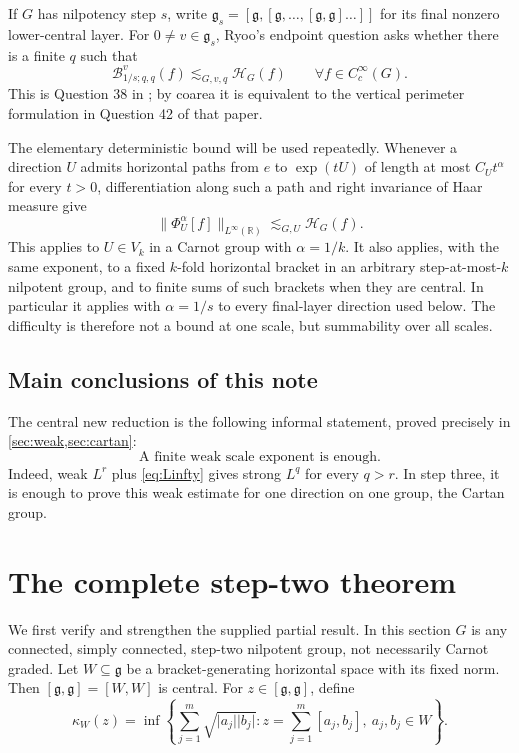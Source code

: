 \documentclass[11pt]{article}
\theoremstyle{definition}
\theoremstyle{remark}
\newcommand{\R}{\mathbb R}
\newcommand{\g}{\mathfrak g}
\newcommand{\abs}[1]{\lvert #1\rvert}
\newcommand{\norm}[1]{\lVert #1\rVert}
\newcommand{\HH}{\mathcal H}
\newcommand{\B}[4]{\mathcal B^{#1}_{#2;#3,#4}}
\newcommand{\prof}[3]{\Phi^{#1}_{#2}[#3]}
\newcommand{\less}{\lesssim}
\begin{document}
If \(G\) has nilpotency step \(s\), write \(\g_s=[\g,[\g,\ldots,[\g,\g]\ldots]]\)
for its final nonzero lower-central layer.  For \(0\ne v\in\g_s\), Ryoo's endpoint
question asks whether there is a finite \(q\) such that
\begin{equation}\label{eq:Ryoo}
 \B{v}{1/s}{q}{q}(f)\less_{G,v,q}\HH_G(f)
 \qquad\forall f\in C_c^\infty(G).
\end{equation}
This is Question 38 in \cite{Ryoo2026}; by coarea it is equivalent to the vertical
perimeter formulation in Question 42 of that paper.

The elementary deterministic bound will be used repeatedly.  Whenever a direction
\(U\) admits horizontal paths from \(e\) to \(\exp(tU)\) of length at most
\(C_Ut^\alpha\) for every \(t>0\), differentiation along such a path and right
invariance of Haar measure give
\begin{equation}\label{eq:Linfty}
 \norm{\prof{\alpha}{U}{f}}_{L^\infty(\R)}
 \less_{G,U}\HH_G(f).
\end{equation}
This applies to \(U\in V_k\) in a Carnot group with \(\alpha=1/k\).  It also applies,
with the same exponent, to a fixed \(k\)-fold horizontal bracket in an arbitrary
step-at-most-\(k\) nilpotent group, and to finite sums of such brackets when they are
central.  In particular it applies with \(\alpha=1/s\) to every final-layer direction
used below.  The difficulty is therefore not a bound at one scale, but summability over
all scales.

\subsection*{Main conclusions of this note}

The central new reduction is the following informal statement, proved precisely in
\cref{sec:weak,sec:cartan}:
\[
 \boxed{\text{A finite weak scale exponent is enough.}}
\]
Indeed, weak \(L^r\) plus \eqref{eq:Linfty} gives strong \(L^q\) for every \(q>r\).
In step three, it is enough to prove this weak estimate for one direction on one group,
the Cartan group.

\section{The complete step-two theorem}\label{sec:step2}

We first verify and strengthen the supplied partial result.  In this section \(G\) is any
connected, simply connected, step-two nilpotent group, not necessarily Carnot graded.
Let \(W\subseteq\g\) be a bracket-generating horizontal space with its fixed norm.  Then
\([\g,\g]=[W,W]\) is central.  For \(z\in[\g,\g]\), define
\begin{equation}\label{eq:kappa}
 \kappa_W(z)=\inf\left\{
 \sum_{j=1}^m\sqrt{\abs{a_j}\abs{b_j}}:
 z=\sum_{j=1}^m[a_j,b_j],\ a_j,b_j\in W
 \right\}.
\end{equation}
\end{document}
